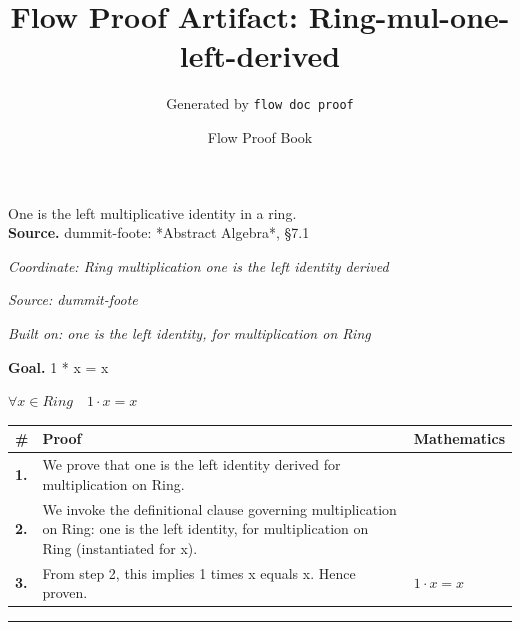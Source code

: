 \documentclass[11pt]{article}
\title{Flow Proof Artifact: Ring-mul-one-left-derived}
\author{Generated by \texttt{flow doc proof}}
\date{Flow Proof Book}
\theoremstyle{definition}
\begin{document}
\maketitle
One is the left multiplicative identity in a ring.\\[0.5em]
\textbf{Source.} dummit-foote: *Abstract Algebra*, §7.1\\[0.5em]
\bigskip
{}\par
\smallskip\noindent\textit{Coordinate: Ring \cdot multiplication \cdot one is the left identity derived}\par
\smallskip\noindent\textit{Source: dummit-foote}\par
\smallskip\noindent\textit{Built on: one is the left identity, for multiplication on Ring}\par
\medskip
\noindent\textbf{Goal.} 1 * x = x\par
\noindent$\displaystyle \forall x \in Ring\quad 1 \cdot x = x$\par
\medskip
\noindent
\begin{tabular}{@{} >{\raggedright\arraybackslash}p{} >{\raggedright\arraybackslash}p{} >{\raggedleft\arraybackslash}p{} @{}}
\textbf{\#} & \textbf{Proof} & \textbf{Mathematics} \\
\midrule
\textbf{1.} & We prove that one is the left identity derived for multiplication on Ring. & \\[0.45em]
\textbf{2.} & We invoke the definitional clause governing multiplication on Ring: one is the left identity, for multiplication on Ring (instantiated for x). & \\[0.45em]
\textbf{3.} & From step 2, this implies 1 times x equals x. Hence proven. & $\displaystyle 1 \cdot x = x$ \\[0.45em]
\bottomrule
\end{tabular}
\label{thm:Ring-multiplication-one_is_the_left_identity_derived}
\par\medskip\hrule
\end{document}
